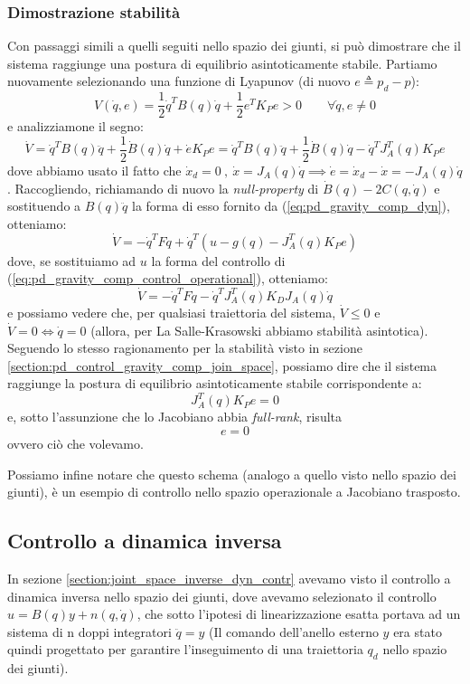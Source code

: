 \subsubsection{Dimostrazione stabilità}
Con passaggi simili a quelli seguiti nello spazio dei giunti, si può dimostrare che il sistema raggiunge una postura di equilibrio asintoticamente stabile.
Partiamo nuovamente selezionando una funzione di Lyapunov (di nuovo $e \triangleq p_d - p$):
$$
V(\dot{q}, e) = \frac{1}{2}\dot{q}^TB(q)\dot{q} + \frac{1}{2}e^TK_Pe > 0 \qquad \forall \dot{q},e \neq 0
$$
e analizziamone il segno:
$$
\dot{V} = \dot{q}^TB(q)\ddot{q} + \frac{1}{2}\dot{B}(q)\dot{q} + \dot{e}K_Pe = \dot{q}^TB(q)\ddot{q} + \frac{1}{2}\dot{B}(q)\dot{q} - \dot{q}^TJ_A^T(q)K_Pe
$$
dove abbiamo usato il fatto che $\dot{x}_d = 0 \ , \ \dot{x}=J_A(q)\dot{q} \implies \dot{e} = \dot{x}_d - \dot{x} = - J_A(q)\dot{q}$.
Raccogliendo, richiamando di nuovo la \textit{null-property} di $\dot{B}(q) - 2C(q, \dot{q})$ e sostituendo a $B(q)\ddot{q}$ la forma di esso fornito da (\ref{eq:pd_gravity_comp_dyn}), otteniamo:
$$
\dot{V} = -\dot{q}^TF\dot{q} + \dot{q}^T(u - g(q) - J_A^T(q)K_Pe)
$$
dove, se sostituiamo ad $u$ la forma del controllo di (\ref{eq:pd_gravity_comp_control_operational}), otteniamo:
$$
\dot{V} = -\dot{q}^TF\dot{q} - \dot{q}^TJ_A^T(q)K_DJ_A(q)\dot{q}
$$
e possiamo vedere che, per qualsiasi traiettoria del sistema, $\dot{V} \leq 0$ e $\dot{V} = 0 \iff \dot{q} = 0$ (allora, per La Salle-Krasowski abbiamo stabilità asintotica).
Seguendo lo stesso ragionamento per la stabilità visto in sezione \ref{section:pd_control_gravity_comp_join_space}, possiamo dire che il sistema raggiunge la postura di equilibrio asintoticamente stabile corrispondente a:
$$
J_A^T(q)K_Pe = 0
$$
e, sotto l'assunzione che lo Jacobiano abbia \textit{full-rank}, risulta
$$
e = 0
$$
ovvero ciò che volevamo.


Possiamo infine notare che questo schema (analogo a quello visto nello spazio dei giunti), è un esempio di controllo nello spazio operazionale a Jacobiano trasposto.








\subsection{Controllo a dinamica inversa}
In sezione \ref{section:joint_space_inverse_dyn_contr} avevamo visto il controllo a dinamica inversa nello spazio dei giunti, dove avevamo selezionato il controllo $u = B(q)y + n(q, \dot{q})$, che sotto l’ipotesi di linearizzazione esatta portava ad un sistema di n doppi integratori $\ddot{q} = y$ (Il comando dell’anello esterno $y$ era stato quindi progettato per garantire l’inseguimento di una traiettoria $q_d$ nello spazio dei giunti).

